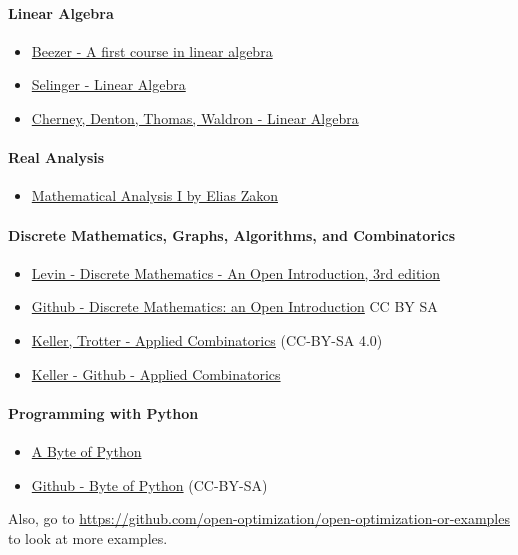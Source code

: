 \paragraph{\textbf{Linear Algebra}}
\begin{itemize}
\item\href{http://linear.ups.edu/html/fcla.html}{Beezer - A first course in linear algebra}
\item\href{https://github.com/selinger/linear-algebra}{Selinger - Linear Algebra}
\item\href{https://www.math.ucdavis.edu/~linear/linear-guest.pdf}{Cherney, Denton, Thomas, Waldron - Linear Algebra}
\end{itemize}

\paragraph{\textbf{Real Analysis}}
\begin{itemize}
\item\href{http://www.trillia.com/zakon-analysisI.html}{Mathematical Analysis I
by Elias Zakon}
\end{itemize}

\paragraph{\textbf{Discrete Mathematics, Graphs, Algorithms, and Combinatorics}}
\begin{itemize}
\item \href{http://discrete.openmathbooks.org/dmoi3.html}{Levin - Discrete Mathematics - An Open Introduction, 3rd edition}
\item \href{https://github.com/oscarlevin/discrete-book}{Github - Discrete Mathematics: an Open Introduction} CC BY SA
\item \href{http://www.rellek.net/book/frontmatter-1.html}{Keller, Trotter - Applied Combinatorics} (CC-BY-SA 4.0)
\item \href{https://github.com/mitchkeller/applied-combinatorics}{Keller - Github -  Applied Combinatorics}
\end{itemize}

\paragraph{\textbf{Programming with Python}}
\begin{itemize}
\item\href{https://open.umn.edu/opentextbooks/textbooks/a-byte-of-python}{A Byte of Python}
\item\href{https://github.com/swaroopch/byte-of-python}{Github - Byte of Python} (CC-BY-SA)
\end{itemize}



Also, go to \url{https://github.com/open-optimization/open-optimization-or-examples} to look at more examples.
